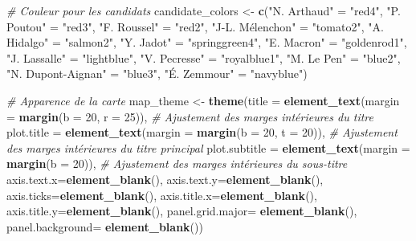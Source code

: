 \documentclass[
]{article}
\newenvironment{Shaded}{\begin{snugshade}}{\end{snugshade}}
\newcommand{\AttributeTok}[1]{\textcolor[rgb]{0.13,0.29,0.53}{#1}}
\newcommand{\CommentTok}[1]{\textcolor[rgb]{0.56,0.35,0.01}{\textit{#1}}}
\newcommand{\DecValTok}[1]{\textcolor[rgb]{0.00,0.00,0.81}{#1}}
\newcommand{\FunctionTok}[1]{\textcolor[rgb]{0.13,0.29,0.53}{\textbf{#1}}}
\newcommand{\NormalTok}[1]{#1}
\newcommand{\OtherTok}[1]{\textcolor[rgb]{0.56,0.35,0.01}{#1}}
\newcommand{\StringTok}[1]{\textcolor[rgb]{0.31,0.60,0.02}{#1}}
\begin{document}
\begin{Shaded}
\begin{Highlighting}[]
\CommentTok{\# Couleur pour les candidats}
\NormalTok{candidate\_colors }\OtherTok{\textless{}{-}} \FunctionTok{c}\NormalTok{(}\StringTok{"N. Arthaud"} \OtherTok{=} \StringTok{"red4"}\NormalTok{, }
                      \StringTok{"P. Poutou"} \OtherTok{=} \StringTok{"red3"}\NormalTok{,}
                      \StringTok{"F. Roussel"} \OtherTok{=} \StringTok{"red2"}\NormalTok{,}
                      \StringTok{"J{-}L. Mélenchon"} \OtherTok{=} \StringTok{"tomato2"}\NormalTok{,}
                      \StringTok{"A. Hidalgo"} \OtherTok{=} \StringTok{"salmon2"}\NormalTok{,}
                      \StringTok{"Y. Jadot"} \OtherTok{=} \StringTok{"springgreen4"}\NormalTok{,}
                      \StringTok{"E. Macron"} \OtherTok{=} \StringTok{"goldenrod1"}\NormalTok{, }
                      \StringTok{"J. Lassalle"} \OtherTok{=} \StringTok{"lightblue"}\NormalTok{,}
                      \StringTok{"V. Pecresse"} \OtherTok{=} \StringTok{"royalblue1"}\NormalTok{,}
                      \StringTok{"M. Le Pen"} \OtherTok{=} \StringTok{"blue2"}\NormalTok{,}
                      \StringTok{"N. Dupont{-}Aignan"} \OtherTok{=} \StringTok{"blue3"}\NormalTok{,}
                      \StringTok{"É. Zemmour"} \OtherTok{=} \StringTok{"navyblue"}\NormalTok{)}

\CommentTok{\# Apparence de la carte}
\NormalTok{map\_theme }\OtherTok{\textless{}{-}} \FunctionTok{theme}\NormalTok{(}\AttributeTok{title =} \FunctionTok{element\_text}\NormalTok{(}\AttributeTok{margin =} \FunctionTok{margin}\NormalTok{(}\AttributeTok{b =} \DecValTok{20}\NormalTok{, }\AttributeTok{r =} \DecValTok{25}\NormalTok{)), }\CommentTok{\# Ajustement des marges intérieures du titre}
                   \AttributeTok{plot.title =} \FunctionTok{element\_text}\NormalTok{(}\AttributeTok{margin =} \FunctionTok{margin}\NormalTok{(}\AttributeTok{b =} \DecValTok{20}\NormalTok{, }\AttributeTok{t =} \DecValTok{20}\NormalTok{)), }\CommentTok{\# Ajustement des marges intérieures du titre principal}
                   \AttributeTok{plot.subtitle =} \FunctionTok{element\_text}\NormalTok{(}\AttributeTok{margin =} \FunctionTok{margin}\NormalTok{(}\AttributeTok{b =} \DecValTok{20}\NormalTok{)), }\CommentTok{\# Ajustement des marges intérieures du sous{-}titre}
                   \AttributeTok{axis.text.x=}\FunctionTok{element\_blank}\NormalTok{(),}
                   \AttributeTok{axis.text.y=}\FunctionTok{element\_blank}\NormalTok{(),}
                   \AttributeTok{axis.ticks=}\FunctionTok{element\_blank}\NormalTok{(),}
                   \AttributeTok{axis.title.x=}\FunctionTok{element\_blank}\NormalTok{(),}
                   \AttributeTok{axis.title.y=}\FunctionTok{element\_blank}\NormalTok{(),}
                   \AttributeTok{panel.grid.major=} \FunctionTok{element\_blank}\NormalTok{(), }
                   \AttributeTok{panel.background=} \FunctionTok{element\_blank}\NormalTok{()) }


\end{Highlighting}
\end{Shaded}
\end{document}
